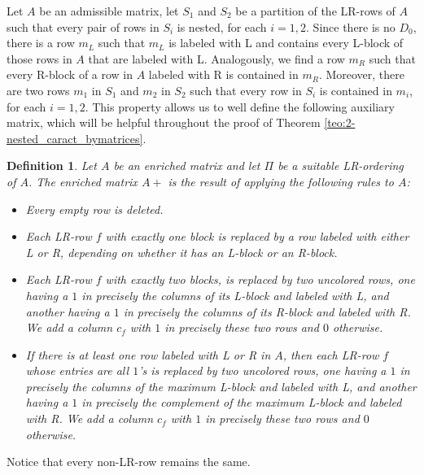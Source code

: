 \documentclass[12pt]{book}
\theoremstyle{plain}
\newtheorem{defn}[teo]{Definition}
\theoremstyle{remark}
\begin{document}
	 Let $A$ be an admissible matrix, let $S_1$ and $S_2$ be a partition of the LR-rows of $A$ such that every pair of rows in $S_i$ is nested, for each $i=1,2$. 
	 Since there is no $D_0$, there is a row $m_L$ such that $m_L$ is labeled with L and contains every L-block of those rows in $A$ that are labeled with L. Analogously, we find a row $m_R$ such that every R-block of a row in $A$ labeled with R is contained in $m_R$. Moreover, there are two rows $m_1$ in $S_1$ and $m_2$ in $S_2$ such that every row in $S_i$ is contained in $m_i$, for each $i=1,2$.
	 This property allows us to well define the following auxiliary matrix, which will be helpful throughout the proof of Theorem \ref{teo:2-nested_caract_bymatrices}.


\begin{defn} \label{def:A+}
Let $A$ be an enriched matrix and let $\Pi$ be a suitable LR-ordering of $A$. The enriched matrix $A+$ is the result of applying the following rules to $A$:
\begin{itemize}
	\item Every empty row is deleted.

	\item Each LR-row $f$ with exactly one block is replaced by a row labeled with either L or R, depending on whether it has an L-block or an R-block.

	\item Each LR-row $f$ with exactly two blocks, is replaced by two uncolored rows, one having a $1$ in precisely the columns of its L-block and labeled with L, and another having a $1$ in precisely the columns of its R-block and labeled with R. We add a column $c_f$ with $1$ in precisely these two rows and $0$ otherwise. 

	\item If there is at least one row labeled with L or R in $A$, then each LR-row $f$ whose entries are all $1$'s is replaced by two uncolored rows, one having a $1$ in precisely the columns of the maximum L-block and labeled with L, and another having a $1$ in precisely the complement of the maximum L-block and labeled with R. We add a column $c_f$ with $1$ in precisely these two rows and $0$ otherwise.  

\end{itemize}
\end{defn} 

Notice that every non-LR-row remains the same.
\end{document}
